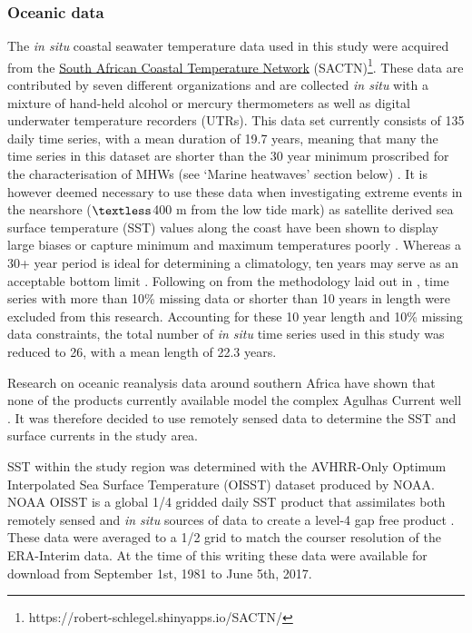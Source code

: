 \documentclass[utf8]{frontiersSCNS}
\begin{document}
\subsubsection{Oceanic data}
The \emph{in situ} coastal seawater temperature data used in this study were acquired from the \href{https://github.com/ajsmit/SACTN}{South African Coastal Temperature Network} (SACTN)\footnote{https://robert-schlegel.shinyapps.io/SACTN/}. These data are contributed by seven different organizations and are collected \emph{in situ} with a mixture of hand-held alcohol or mercury thermometers as well as digital underwater temperature recorders (UTRs). This data set currently consists of 135 daily time series, with a mean duration of 19.7 years, meaning that many the time series in this dataset are shorter than the 30 year minimum proscribed for the characterisation of MHWs (see `Marine heatwaves' section below) \citep{Hobday2016}. It is however deemed necessary to use these data when investigating extreme events in the nearshore ($\textless$400 m from the low tide mark) as satellite derived sea surface temperature (SST) values along the coast have been shown to display large biases \citep{Smit2013} or capture minimum and maximum temperatures poorly \citep{Smale2009, Castillo2010}. Whereas a 30+ year period is ideal for determining a climatology, ten years may serve as an acceptable bottom limit \citep{Schlegel2017}. Following on from the methodology laid out in \citet{Schlegel2017}, time series with more than 10\% missing data or shorter than 10 years in length were excluded from this research. Accounting for these 10 year length and 10\% missing data constraints, the total number of \emph{in situ} time series used in this study was reduced to 26, with a mean length of 22.3 years.

Research on oceanic reanalysis data around southern Africa have shown that none of the products currently available model the complex Agulhas Current well \citep{Cooper2014}. It was therefore decided to use remotely sensed data to determine the SST and surface currents in the study area.

SST within the study region was determined with the AVHRR-Only Optimum Interpolated Sea Surface Temperature (OISST) dataset produced by NOAA. NOAA OISST is a global 1/4\degree \: gridded daily SST product that assimilates both remotely sensed and \emph{in situ} sources of data to create a level-4 gap free product \citep{Banzon2016}. These data were averaged to a 1/2\degree \: grid to match the courser resolution of the ERA-Interim data. At the time of this writing these data were available for download from September 1st, 1981 to June 5th, 2017.
\end{document}
